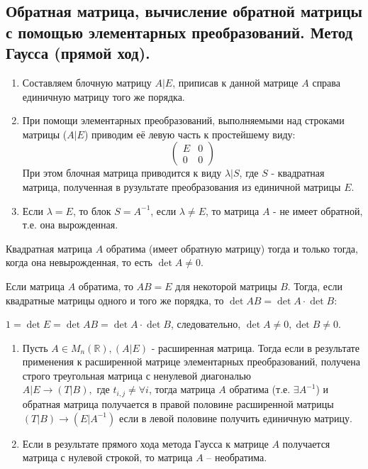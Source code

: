 \documentclass[a4paper,14pt]{article}
\begin{document}
\subsection{Обратная матрица, вычисление обратной матрицы с помощью элементарных преобразований. Метод Гаусса (прямой ход).}
\begin{enumerate}
	\item Составляем блочную матрицу $A|E$, приписав к данной матрице $A$ справа единичную матрицу того же порядка.
	\item При помощи элементарных преобразований, выполняемыми над строками матрицы ($A|E$) приводим её левую часть к простейшему виду:
	\[
	\begin{pmatrix}
	E & 0 \\
	0 & 0
	\end{pmatrix}
	\]
	При этом блочная матрица приводится к виду $\lambda|S$, где $S$ - квадратная матрица, полученная в рузультате преобразования из единичной матрицы $E$.
	\item Если $\lambda=E$, то блок $S=A^{-1}$, если $\lambda \ne E$, то матрица $A$ - не имеет обратной, т.е. она вырожденная.
\end{enumerate}
\begin{theorem}
	Квадратная матрица $A$ обратима (имеет обратную матрицу) тогда и только тогда, когда она невырожденная, то есть $\det A \ne 0$.
\end{theorem}
\begin{evidence}
	Если матрица $A$ обратима, то $AB=E$ для некоторой матрицы $B$. Тогда, если квадратные матрицы одного и того же порядка, то $\det AB = \det A \cdot \det B$:
	
	\noindent $1=\det E = \det AB = \det A \cdot \det B$, следовательно, $\det A \ne 0, \det B \ne 0$.
\end{evidence}
\begin{remark}
	\indent
	\begin{enumerate}
		\item Пусть $A \in M_{n}(\mathbb{R}), (A|E)$ - расширенная матрица. Тогда если в результате применения к расширенной матрице элементарных преобразований, получена строго треугольная матрица с ненулевой диагональю $A|E \rightarrow (T|B), \text{ где } t_{i,j} \ne \forall i$, тогда матрица $A$ обратима (т.е. $\exists A^{-1}$) и обратная матрица получается в правой половине расширенной матрицы $(T|B) \rightarrow (E|A^{-1})$ если в левой половине получить единичную матрицу.
		\item Если в результате прямого хода метода Гаусса к матрице $A$ получается матрица с нулевой строкой, то матрица $A$ – необратима.
	\end{enumerate}
\end{remark}
\end{document}
